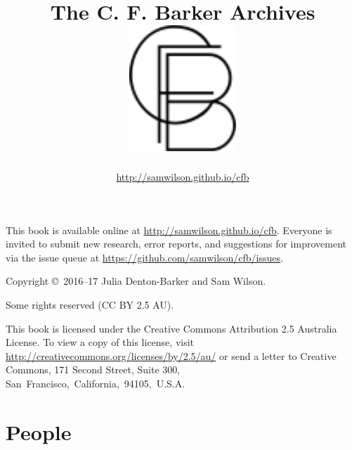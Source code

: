 \documentclass[a4paper]{book}
\title{The C. F. Barker Archives \\ \vspace{1cm} \includegraphics[width=0.3\textwidth]{CFB_monogram} }
\author{\url{http://samwilson.github.io/cfb}}
\begin{document}
\maketitle
 
\thispagestyle{empty}
\begin{center}\footnotesize
This book is available online at \url{http://samwilson.github.io/cfb}.
Everyone is invited to submit new research, error reports, and suggestions for improvement
via the issue queue at \url{https://github.com/samwilson/cfb/issues}.

\vspace{1cm}

Copyright \copyright\ 2016--17 Julia Denton-Barker and Sam Wilson.

Some rights reserved (CC BY 2.5 AU).

This book is licensed under the Creative Commons Attribution 2.5 Australia License.
To view a copy of this license, visit \url{http://creativecommons.org/licenses/by/2.5/au/} or send a letter to Creative Commons, 171 Second Street, Suite 300, San~Francisco,~California,~94105,~U.S.A.
\end{center}

\tableofcontents

\chapter{People}

\raggedbottom











































\end{document}
